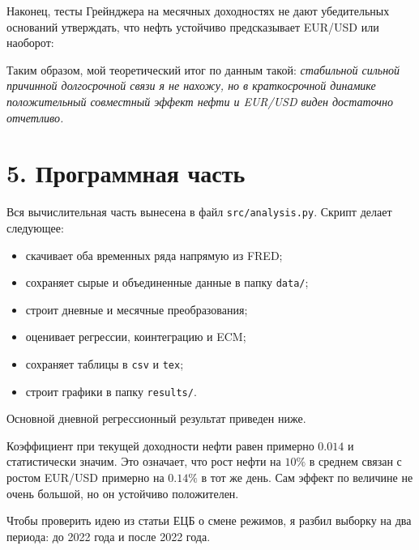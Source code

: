 \documentclass[a4paper,12pt]{article}
\begin{document}
Наконец, тесты Грейнджера на месячных доходностях не дают убедительных оснований утверждать, что нефть устойчиво предсказывает EUR/USD или наоборот:

\begin{center}

\end{center}

Таким образом, мой теоретический итог по данным такой: \textit{стабильной сильной причинной долгосрочной связи я не нахожу, но в краткосрочной динамике положительный совместный эффект нефти и EUR/USD виден достаточно отчетливо.}

\section*{5. Программная часть}
Вся вычислительная часть вынесена в файл \texttt{src/analysis.py}. Скрипт делает следующее:
\begin{itemize}
    \item скачивает оба временных ряда напрямую из FRED;
    \item сохраняет сырые и объединенные данные в папку \texttt{data/};
    \item строит дневные и месячные преобразования;
    \item оценивает регрессии, коинтеграцию и ECM;
    \item сохраняет таблицы в \texttt{csv} и \texttt{tex};
    \item строит графики в папку \texttt{results/}.
\end{itemize}

Основной дневной регрессионный результат приведен ниже.

\begin{center}

\end{center}

Коэффициент при текущей доходности нефти равен примерно $0.014$ и статистически значим. Это означает, что рост нефти на $10\%$ в среднем связан с ростом EUR/USD примерно на $0.14\%$ в тот же день. Сам эффект по величине не очень большой, но он устойчиво положителен.

Чтобы проверить идею из статьи ЕЦБ о смене режимов, я разбил выборку на два периода: до 2022 года и после 2022 года.

\begin{center}
\resizebox{\textwidth}{!}{}
\end{center}
\end{document}
